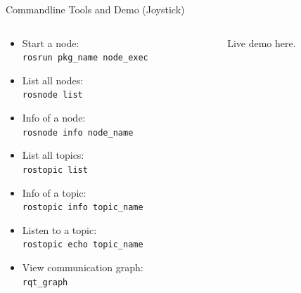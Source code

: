 \documentclass[aspectratio=43]{beamer}
\newcommand{\inline}[1]{\texttt{#1}}
\begin{document}
\begin{frame}{Commandline Tools and Demo (Joystick)}
	\begin{columns}
		\begin{column}{0.5\textwidth}
			\begin{itemize}
				\item Start a node:\\\inline{rosrun pkg_name node_exec}
				\item List all nodes:\\\inline{rosnode list}
				\item Info of a node:\\\inline{rosnode info node_name}
				\item List all topics:\\\inline{rostopic list}
				\item Info of a topic:\\\inline{rostopic info topic_name}
				\item Listen to a topic:\\\inline{rostopic echo topic_name}
				\item View communication graph:\\\inline{rqt_graph}
			\end{itemize}
		\end{column}
		\begin{column}{0.5\textwidth}
			\centering
			Live demo here.
		\end{column}
	\end{columns}
\end{frame}
\end{document}
